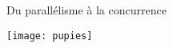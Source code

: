 
\begingroup

\begin{frame}{Du parallélisme à la concurrence}
  \begin{center}
    \texttt{[image: pupies]}
  \end{center}
\end{frame}

\endgroup
\endinput
